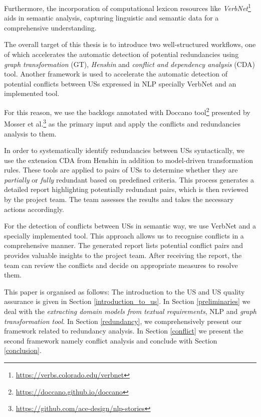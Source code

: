 Furthermore, the incorporation of computational lexicon resources like \emph{VerbNet}\footnote{\href{https://verbs.colorado.edu/verbnet}{https://verbs.colorado.edu/verbnet}} aids in semantic analysis, capturing linguistic and semantic data for a comprehensive understanding.

The overall target of this thesis is to introduce two well-structured workflows, one of which accelerates the automatic detection of potential redundancies using \textit{graph transformation} (GT), \textit{Henshin} and \textit{conflict and dependency analysis} (CDA) tool. Another framework is used to accelerate the automatic detection of potential conflicts between USs expressed in NLP specially VerbNet and an implemented tool.

For this reason, we use the backlogs annotated with Doccano tool\footnote{\href{https://doccano.github.io/doccano}{https://doccano.github.io/doccano}} presented by Mosser et al.\footnote{\href{https://github.com/ace-design/nlp-stories}{https://github.com/ace-design/nlp-stories}} as the primary input \cite{arulmohan2023extracting} and apply the conflicts and redundancies analysis to them.

In order to systematically identify redundancies between USs syntactically, we use the extension CDA from Henshin in addition to model-driven transformation rules. These tools are applied to pairs of USs to determine whether they are \textit{partially} or \textit{fully} redundant based on predefined criteria. This process generates a detailed report highlighting potentially redundant pairs, which is then reviewed by the project team. The team assesses the results and takes the necessary actions accordingly.

For the detection of conflicts between USs in semantic way, we use VerbNet and a specially implemented tool. This approach allows us to recognise conflicts in a comprehensive manner. The generated report lists potential conflict pairs and provides valuable insights to the project team. After receiving the report, the team can review the conflicts and decide on appropriate measures to resolve them.

This paper is organised as follows: The introduction to the US and US quality assurance is given in Section \ref{introduction_to_us}. In Section \ref{preliminaries} we deal with the \textit{extracting domain models from textual requirements}, NLP and \textit{graph transformation tool}. In Section \ref{redundancy}, we comprehensively present our framework related to redundancy analysis. In Section \ref{conflict} we present the second framework namely conflict analysis and conclude with Section \ref{conclusion}.
